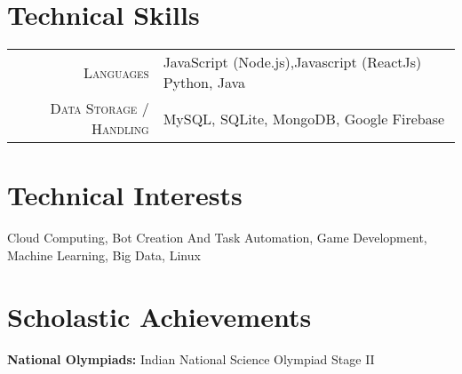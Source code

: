 \documentclass[a4paper,10pt]{extarticle} %
\begin{document}
\section{\LARGE{\textcolor{primary}{Technical Skills}}}
\vspace{0.4cm}

\begin{tabular}{r|p{15cm}}
\textsc{\Large{Languages}} & \Large{JavaScript (Node.js),Javascript (ReactJs) Python, Java} \\
\textsc{\Large{Data Storage / Handling}} & \Large{MySQL, SQLite, MongoDB, Google Firebase }\\

\end{tabular}





\vspace{0.6cm}
\section{\LARGE{\textcolor{primary}{Technical Interests}}}
\vspace{0.4cm}


\Large{Cloud Computing, Bot Creation And Task Automation, Game Development, Machine Learning, Big Data, Linux }\\


\vspace{0.4cm}
\section{\LARGE{\textcolor{primary}{Scholastic Achievements}}}

\vspace{0.4cm}

\Large{ \textbf{National Olympiads:}  Indian National Science Olympiad Stage II} \\




\end{document}
